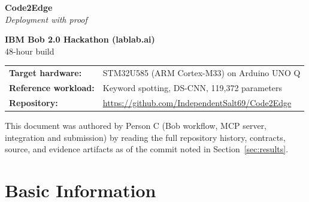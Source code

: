 \documentclass[11pt,a4paper]{article}
\begin{document}
\begin{titlepage}
\centering
\vspace*{1.5cm}

{\Huge\bfseries\color{c2ePrimary} Code2Edge}\\[0.4cm]
{\Large\itshape\color{c2eAccent} Deployment with proof}\\[1.2cm]


\vfill

{\large\bfseries IBM Bob 2.0 Hackathon (lablab.ai)}\\[0.2cm]
{\normalsize\color{c2eGray} 48-hour build}\\[1cm]

\begin{tabular}{ll}
\textbf{Target hardware:} & STM32U585 (ARM Cortex-M33) on Arduino UNO Q \\
\textbf{Reference workload:} & Keyword spotting, DS-CNN, 119{,}372 parameters \\
\textbf{Repository:} & \url{https://github.com/IndependentSalt69/Code2Edge}
\end{tabular}

\vspace{1.5cm}
{\small\color{c2eGray} This document was authored by Person C (Bob workflow,
MCP server, integration and submission) by reading the full repository
history, contracts, source, and evidence artifacts as of the commit noted
in Section~\ref{sec:results}.}

\end{titlepage}

\tableofcontents
\newpage

\section{Basic Information}
\label{sec:basic}
\end{document}

